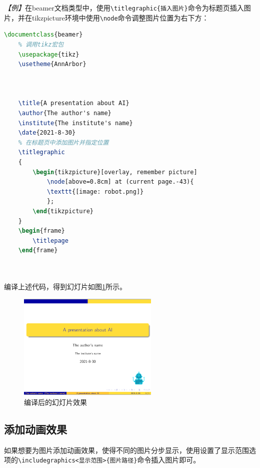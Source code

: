 \emph{【例】}在beamer文档类型中，使用\texttt{\textbackslash{}titlegraphic\{插入图片\}}命令为标题页插入图片，并在tikzpicture环境中使用\texttt{\textbackslash{}node}命令调整图片位置为右下方：
\begin{lstlisting}[language=TeX]
    \documentclass{beamer}
    % 调用tikz宏包
    \usepackage{tikz}
    \usetheme{AnnArbor}

    

    \title{A presentation about AI}
    \author{The author's name}
    \institute{The institute's name}
    \date{2021-8-30}
    % 在标题页中添加图片并指定位置
    \titlegraphic
    {
        \begin{tikzpicture}[overlay, remember picture]
            \node[above=0.8cm] at (current page.-43){
            \texttt{[image: robot.png]}
            };
        \end{tikzpicture}
    }
    \begin{frame}
        \titlepage
    \end{frame}

    
\end{lstlisting}

编译上述代码，得到幻灯片如图\ref{fig:951}所示。

\begin{figure}[htbp]
    \centering
    \includegraphics[width = 0.6\textwidth]{images/ch_9/eg6_11.png}
    \caption{编译后的幻灯片效果}
    \label{fig:951}
\end{figure}

\subsection{添加动画效果}

如果想要为图片添加动画效果，使得不同的图片分步显示，使用设置了显示范围选项的\texttt{\textbackslash{}includegraphics<显示范围>\{图片路径\}}命令插入图片即可。

